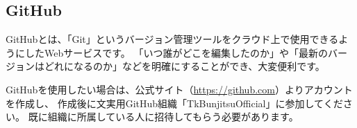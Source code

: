 \begin{multicols*}{2}
\section{GitHub}
GitHubとは、「Git」というバージョン管理ツールをクラウド上で使用できるようにしたWebサービスです。
「いつ誰がどこを編集したのか」や「最新のバージョンはどれになるのか」などを明確にすることができ、大変便利です。

GitHubを使用したい場合は、公式サイト（\url{https://github.com}）よりアカウントを作成し、
作成後に文実用GitHub組織「TkBunjitsuOfficial」に参加してください。
既に組織に所属している人に招待してもらう必要があります。
　　
\vspace{-20mm}
\end{multicols*}

